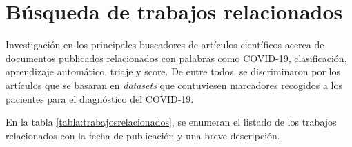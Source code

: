  \label{trabajosrel}

\section{Búsqueda de trabajos relacionados}
Investigación en los principales buscadores de artículos científicos acerca de documentos publicados relacionados con palabras como COVID-19, clasificación, aprendizaje automático, triaje y score. De entre todos, se discriminaron por los artículos que se basaran en \textit{datasets} que contuviesen marcadores recogidos a los pacientes para el diagnóstico del COVID-19.

En la tabla \ref{tabla:trabajosrelacionados}, se enumeran el listado de los trabajos relacionados con la fecha de publicación y una breve descripción.

